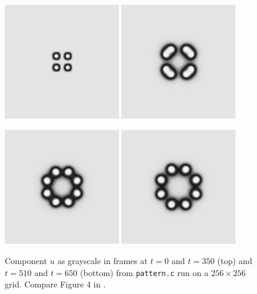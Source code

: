 \begin{figure}
\includegraphics[width=0.45\textwidth]{figs/pattern000} \quad
\includegraphics[width=0.45\textwidth]{figs/pattern350}

\medskip \medskip
\includegraphics[width=0.45\textwidth]{figs/pattern510} \quad
\includegraphics[width=0.45\textwidth]{figs/pattern650}
\caption{Component $u$ as grayscale in frames at $t=0$ and $t=350$ (top) and $t=510$ and $t=650$ (bottom) from \texttt{pattern.c} run on a $256\times 256$ grid.  Compare Figure 4 in \citep{Pearson1993}.}
\label{fig:ts:pattern:figureversuspearson}
\end{figure}

